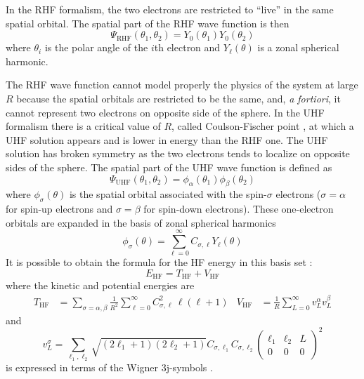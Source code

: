 \documentclass[11pt,a4paper]{article}
\begin{document}
In the RHF formalism, the two electrons are restricted to ``live'' in the same spatial orbital.
The spatial part of the RHF wave function is then
\begin{equation}\label{eq:RHF_WF}
	\Psi_{\text{RHF}}(\theta_1,\theta_2) = Y_0(\theta_1) Y_0(\theta_2)
\end{equation}
where $\theta_i$ is the polar angle of the $i$th electron and $Y_{\ell}(\theta)$ is a zonal spherical harmonic. 

The RHF wave function cannot model properly the physics of the system at large $R$ because the spatial orbitals are restricted to be the same, and, \textit{a fortiori}, it cannot represent two electrons on opposite side of the sphere. 
In the UHF formalism there is a critical value of $R$, called Coulson-Fischer point \cite{Coulson_1949}, at which a UHF solution appears and is lower in energy than the RHF one.
The UHF solution has broken symmetry as the two electrons tends to localize on opposite sides of the sphere. 
The spatial part of the UHF wave function is defined as
\begin{equation}\label{eq:UHF_WF}
	\Psi_{\text{UHF}}(\theta_1,\theta_2)=\phi_\alpha(\theta_1)\phi_\beta(\theta_2)
\end{equation}
where $\phi_\sigma(\theta)$ is the spatial orbital associated with the spin-$\sigma$ electrons ($\sigma = \alpha$ for spin-up electrons and $\sigma = \beta$ for spin-down electrons).
These one-electron orbitals are expanded in the basis of zonal spherical harmonics
\begin{equation}
	\phi_\sigma(\theta)=\sum_{\ell=0}^{\infty}C_{\sigma,\ell}Y_{\ell}(\theta)
\end{equation}
It is possible to obtain the formula for the HF energy in this basis set \cite{Loos_2009}:
\begin{equation}
	E_{\text{HF}} = T_{\text{HF}} + V_{\text{HF}}
\label{eq:EHF}
\end{equation}
where the kinetic and potential energies are
\begin{align}
	T_{\text{HF}} & = \sum_{\sigma=\alpha,\beta} \frac{1}{R^2} \sum_{\ell=0}^{\infty} C_{\sigma,\ell}^2 \, \ell(\ell+1)
	&
	V_{\text{HF}} & = \frac{1}{R} \sum_{L=0}^{\infty} 
	v^\alpha_{L} v^\beta_{L} 
\end{align}
and
\begin{equation}
	v^\sigma_{L} 
	=  \sum_{\ell_1,\ell_2} \sqrt{(2\ell_1+1)(2\ell_2+1)} C_{\sigma,\ell_1}C_{\sigma,\ell_2}
	\begin{pmatrix}
		\ell_1 & \ell_2 & L 
		\\
		0 & 0 & 0
	\end{pmatrix}^2 
\end{equation}
is expressed in terms of the Wigner 3j-symbols \cite{AngularBook}.
\end{document}
